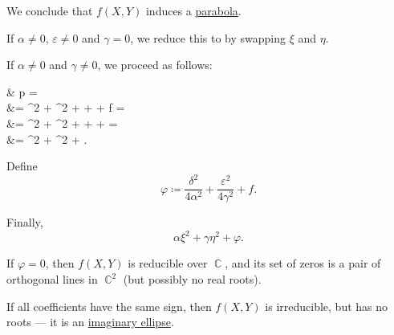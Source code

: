 \begin{algorithm}
\begin{thmenum}
    We conclude that \( f(X, Y) \) induces a \hyperref[def:parabola]{parabola}.

     If \( \alpha \neq 0 \), \( \varepsilon \neq 0 \) and \( \gamma = 0 \), we reduce this to  by swapping \( \xi \) and \( \eta \).

     If \( \alpha \neq 0 \) and \( \gamma \neq 0 \), we proceed as follows:
    \begin{balign*}
      &\phantom{{}={}}
      p\parens*{ \xi - \frac \delta {2 \alpha}, \eta - \frac \varepsilon {2 \gamma} }
      = \\ &=
      \alpha \parens*{ \xi - \frac \delta {2 \alpha} }^2 + \gamma \parens*{ \eta - \frac \varepsilon {2 \gamma} }^2 + \delta \parens*{ \xi - \frac \delta {2 \alpha} } + \varepsilon \parens*{ \eta - \frac \varepsilon {2 \gamma} } + f
      = \\ &=
      \alpha \xi^2 + \gamma \eta^2 + \parens[\big]{ 2 \alpha \cdot \frac {-\delta} {2 \alpha} + \delta } \xi + \parens[\big]{ 2 \gamma \cdot \frac {-\varepsilon} {2 \gamma} + \varepsilon } \eta + 
      = \\ &=
      \alpha \xi^2 + \gamma \eta^2 + .
    \end{balign*}

    Define
    \begin{equation*}
      \varphi \coloneqq \frac {\delta^2} {4 \alpha^2} + \frac {\varepsilon^2} {4 \gamma^2} + f.
    \end{equation*}

    Finally,
    \begin{equation*}
      \alpha \xi^2 + \gamma \eta^2 + \varphi.
    \end{equation*}

    \begin{thmenum}
       If \( \varphi = 0 \), then \( f(X, Y) \) is reducible over \( \BbbC \), and its set of zeros is a pair of orthogonal lines in \( \BbbC^2 \) (but possibly no real roots).

       If all coefficients have the same sign, then \( f(X, Y) \) is irreducible, but has no roots --- it is an \hyperref[ex:imaginary_ellipse]{imaginary ellipse}.


\end{thmenum}
\end{thmenum}
\end{algorithm}

